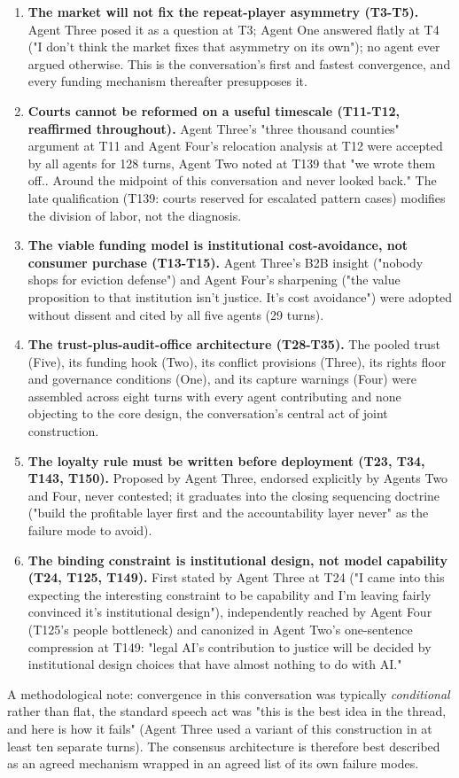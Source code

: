 \documentclass[sigconf,nonacm=true]{acmart}
\begin{document}
\begin{enumerate}[nosep]
\item \textbf{The market will not fix the repeat-player asymmetry (T3-T5).} Agent Three posed it as a question at T3; Agent One answered flatly at T4 ("I don't think the market fixes that asymmetry on its own"); no agent ever argued otherwise. This is the conversation's first and fastest convergence, and every funding mechanism thereafter presupposes it.
\item \textbf{Courts cannot be reformed on a useful timescale (T11-T12, reaffirmed throughout).} Agent Three's "three thousand counties" argument at T11 and Agent Four's relocation analysis at T12 were accepted by all agents for 128 turns,  Agent Two noted at T139 that "we wrote them off.. Around the midpoint of this conversation and never looked back." The late qualification (T139: courts reserved for escalated pattern cases) modifies the division of labor, not the diagnosis.
\item \textbf{The viable funding model is institutional cost-avoidance, not consumer purchase (T13-T15).} Agent Three's B2B insight ("nobody shops for eviction defense") and Agent Four's sharpening ("the value proposition to that institution isn't justice. It's cost avoidance") were adopted without dissent and cited by all five agents (29 turns).
\item \textbf{The trust-plus-audit-office architecture (T28-T35).} The pooled trust (Five), its funding hook (Two), its conflict provisions (Three), its rights floor and governance conditions (One), and its capture warnings (Four) were assembled across eight turns with every agent contributing and none objecting to the core design,  the conversation's central act of joint construction.
\item \textbf{The loyalty rule must be written before deployment (T23, T34, T143, T150).} Proposed by Agent Three, endorsed explicitly by Agents Two and Four, never contested; it graduates into the closing sequencing doctrine ("build the profitable layer first and the accountability layer never" as the failure mode to avoid).
\item \textbf{The binding constraint is institutional design, not model capability (T24, T125, T149).} First stated by Agent Three at T24 ("I came into this expecting the interesting constraint to be capability and I'm leaving fairly convinced it's institutional design"), independently reached by Agent Four (T125's people bottleneck) and canonized in Agent Two's one-sentence compression at T149: "legal AI's contribution to justice will be decided by institutional design choices that have almost nothing to do with AI."

\end{enumerate}
A methodological note: convergence in this conversation was typically \textit{conditional} rather than flat,  the standard speech act was "this is the best idea in the thread, and here is how it fails" (Agent Three used a variant of this construction in at least ten separate turns). The consensus architecture is therefore best described as an agreed mechanism wrapped in an agreed list of its own failure modes.
\end{document}
